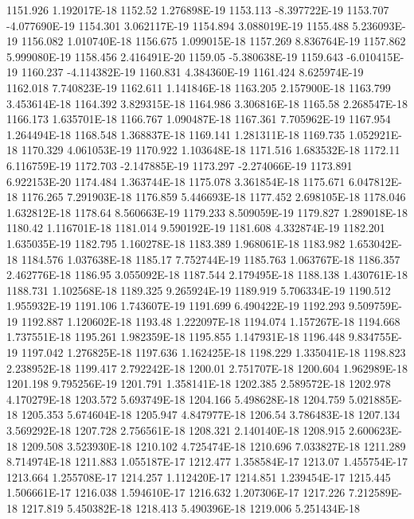 1151.926  1.192017E-18
1152.52  1.276898E-19
1153.113  -8.397722E-19
1153.707  -4.077690E-19
1154.301  3.062117E-19
1154.894  3.088019E-19
1155.488  5.236093E-19
1156.082  1.010740E-18
1156.675  1.099015E-18
1157.269  8.836764E-19
1157.862  5.999080E-19
1158.456  2.416491E-20
1159.05  -5.380638E-19
1159.643  -6.010415E-19
1160.237  -4.114382E-19
1160.831  4.384360E-19
1161.424  8.625974E-19
1162.018  7.740823E-19
1162.611  1.141846E-18
1163.205  2.157900E-18
1163.799  3.453614E-18
1164.392  3.829315E-18
1164.986  3.306816E-18
1165.58  2.268547E-18
1166.173  1.635701E-18
1166.767  1.090487E-18
1167.361  7.705962E-19
1167.954  1.264494E-18
1168.548  1.368837E-18
1169.141  1.281311E-18
1169.735  1.052921E-18
1170.329  4.061053E-19
1170.922  1.103648E-18
1171.516  1.683532E-18
1172.11  6.116759E-19
1172.703  -2.147885E-19
1173.297  -2.274066E-19
1173.891  6.922153E-20
1174.484  1.363744E-18
1175.078  3.361854E-18
1175.671  6.047812E-18
1176.265  7.291903E-18
1176.859  5.446693E-18
1177.452  2.698105E-18
1178.046  1.632812E-18
1178.64  8.560663E-19
1179.233  8.509059E-19
1179.827  1.289018E-18
1180.42  1.116701E-18
1181.014  9.590192E-19
1181.608  4.332874E-19
1182.201  1.635035E-19
1182.795  1.160278E-18
1183.389  1.968061E-18
1183.982  1.653042E-18
1184.576  1.037638E-18
1185.17  7.752744E-19
1185.763  1.063767E-18
1186.357  2.462776E-18
1186.95  3.055092E-18
1187.544  2.179495E-18
1188.138  1.430761E-18
1188.731  1.102568E-18
1189.325  9.265924E-19
1189.919  5.706334E-19
1190.512  1.955932E-19
1191.106  1.743607E-19
1191.699  6.490422E-19
1192.293  9.509759E-19
1192.887  1.120602E-18
1193.48  1.222097E-18
1194.074  1.157267E-18
1194.668  1.737551E-18
1195.261  1.982359E-18
1195.855  1.147931E-18
1196.448  9.834755E-19
1197.042  1.276825E-18
1197.636  1.162425E-18
1198.229  1.335041E-18
1198.823  2.238952E-18
1199.417  2.792242E-18
1200.01  2.751707E-18
1200.604  1.962989E-18
1201.198  9.795256E-19
1201.791  1.358141E-18
1202.385  2.589572E-18
1202.978  4.170279E-18
1203.572  5.693749E-18
1204.166  5.498628E-18
1204.759  5.021885E-18
1205.353  5.674604E-18
1205.947  4.847977E-18
1206.54  3.786483E-18
1207.134  3.569292E-18
1207.728  2.756561E-18
1208.321  2.140140E-18
1208.915  2.600623E-18
1209.508  3.523930E-18
1210.102  4.725474E-18
1210.696  7.033827E-18
1211.289  8.714974E-18
1211.883  1.055187E-17
1212.477  1.358584E-17
1213.07  1.455754E-17
1213.664  1.255708E-17
1214.257  1.112420E-17
1214.851  1.239454E-17
1215.445  1.506661E-17
1216.038  1.594610E-17
1216.632  1.207306E-17
1217.226  7.212589E-18
1217.819  5.450382E-18
1218.413  5.490396E-18
1219.006  5.251434E-18
